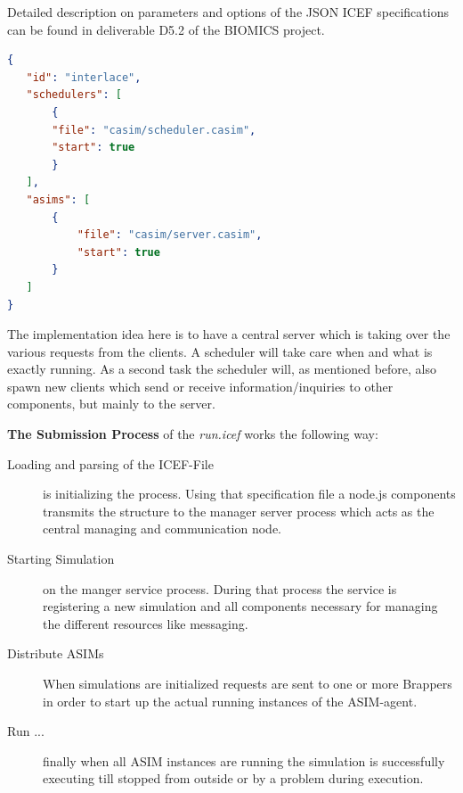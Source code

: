 Detailed description on parameters and options of the JSON ICEF specifications can be found in deliverable D5.2 \cite{BIOMICSD52} of the BIOMICS project.

\begin{minipage}{1.0\textwidth}
\begin{lstlisting}[language=json,firstnumber=1,caption={ICEF Json Specification for Interlace},captionpos=b,label=lst:icef-json-spec]
{
   "id": "interlace", 
   "schedulers": [
       {
	   "file": "casim/scheduler.casim",
	   "start": true
       }
   ], 
   "asims": [       
       {
           "file": "casim/server.casim",
           "start": true
       }
   ]
}
\end{lstlisting}
\end{minipage}

The implementation idea here is to have a central server which is taking over the various requests from the clients. A scheduler will take care when and what is exactly running. As a second task the scheduler will, as mentioned before, also spawn new clients which send or receive information/inquiries to other components, but mainly to the server.

\textbf{The Submission Process} of the \textit{run.icef} works the following way:

\begin{description}
	\item [Loading and parsing of the ICEF-File] is initializing the process. Using that specification file a node.js components transmits the structure to the manager server process which acts as the central managing and communication node.
	\item [Starting Simulation] on the manger service process. During that process the service is registering a new simulation and all components necessary for managing the different resources like messaging.
	\item [Distribute ASIMs] When simulations are initialized requests are sent to one or more Brappers in order to start up the actual running instances of the ASIM-agent.
	\item [Run ...] finally when all ASIM instances are running the simulation is successfully executing till stopped from outside or by a problem during execution.
\end{description}

